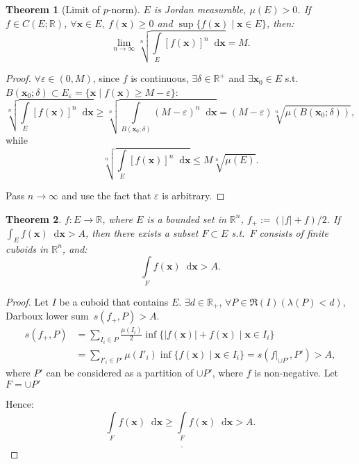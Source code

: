 \documentclass[openany]{book}
\theoremstyle{plain}
\newtheorem{theorem}{Theorem}[section] %
\theoremstyle{definition}
\newcommand{\dif}{\mathop{}\!\mathrm{d}} %
\newcommand*{\bv}{\boldsymbol} %
\begin{document}
\begin{theorem}[Limit of $p$-norm]
	\label{theorem: limit of p-norm}
	$E$ is Jordan measurable, $\mu(E) > 0$. 
	If $f \in C(E; \mathbb R)$, $\forall \bv x \in E$, $f(\bv x) \geq 0$ and $\sup \{f(\bv x) \mid \bv x \in E\}$, then:
	\begin{equation*}
		\lim_{n \to \infty} \sqrt[n]{\int\limits_E [f(\bv x)]^n \dif \bv x}
		= M.
	\end{equation*}
\end{theorem}
\begin{proof}
	$\forall \varepsilon \in (0, M)$, since $f$ is continuous, $\exists \delta \in \mathbb R^+$ and $\exists \bv x_0 \in E$ s.t.\ $B(\bv x_0; \delta) \subset E_\varepsilon = \{\bv x \mid f(\bv x) \geq M - \varepsilon\}$:
	\begin{equation*}
		\sqrt[n]{\int\limits_E [f(\bv x)]^n \dif \bv x} \geq \sqrt[n]{\int\limits_{B(\bv x_0; \delta)} (M - \varepsilon)^n \dif \bv x}
		= (M - \varepsilon) \sqrt[n]{\mu(B(\bv x_0; \delta))},
	\end{equation*}
	while
	\begin{equation*}
		\sqrt[n]{\int\limits_E [f(\bv x)]^n \dif \bv x} \leq M \sqrt[n]{\mu(E)}.
	\end{equation*}

	Pass $n \to \infty$ and use the fact that $\varepsilon$ is arbitrary.
\end{proof}

\begin{theorem}
	\label{theorem: positive part of the integral}
	$f \colon E \to \mathbb R$, where $E$ is a bounded set in $\mathbb R^n$, $f_+ := (|f| + f)/2$. 
	If $\int_E f(\bv x) \dif \bv x > A$, then there exists a subset $F \subset E$ s.t.\ $F$ consists of finite cuboids in $\mathbb R^n$, and:
	\begin{equation*}
		\int\limits_F f(\bv x) \dif \bv x > A.
	\end{equation*}
\end{theorem}
\begin{proof}
	Let $I$ be a cuboid that contains $E$.
	$\exists d \in \mathbb R_+$, $\forall P \in \mathfrak R(I) (\lambda(P) < d)$, Darboux lower sum~$s(f_+, P) > A$. 
	\begin{align*}
		s(f_+, P) &= \sum_{I_i \in P} \frac{\mu(I_i)}{2} \inf\{|f(\bv x)| + f(\bv x) \mid \bv x \in I_i\} 
		\\
		&= \sum_{I'_i \in P'} \mu(I'_i) \inf\{f(\bv x) \mid \bv x \in I_i\}
		= s(f|_{\cup P'}, P') > A,
	\end{align*}
	where $P'$ can be considered as a partition of $\cup P'$, where $f$ is non-negative.
	Let $F = \cup P'$

	Hence:
	\begin{equation*}
		\int\limits_F f(\bv x) \dif \bv x \geq \underline{\int\limits_F} f(\bv x) \dif \bv x > A.
	\end{equation*}
\end{proof}
\end{document}
